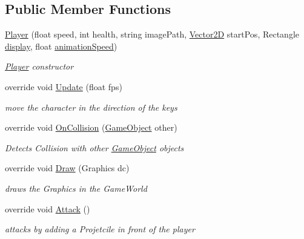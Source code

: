 \subsection*{Public Member Functions}
\begin{DoxyCompactItemize}
\item 
\hyperlink{class_mage_twinstick_1_1_player_ab0f3c00d033f0f20e743c04ae0eb6b11}{Player} (float speed, int health, string image\+Path, \hyperlink{class_mage_twinstick_1_1_vector2_d}{Vector2\+D} start\+Pos, Rectangle \hyperlink{class_mage_twinstick_1_1_game_object_a5807df7f837dc87c8955a008d0b27b50}{display}, float \hyperlink{class_mage_twinstick_1_1_game_object_a5d21c31402c27c5a19f2a62d98720456}{animation\+Speed})
\begin{DoxyCompactList}\small\item\em \hyperlink{class_mage_twinstick_1_1_player}{Player} constructor \end{DoxyCompactList}\item 
override void \hyperlink{class_mage_twinstick_1_1_player_a5324e0350784da0f66369ec5ef52516a}{Update} (float fps)
\begin{DoxyCompactList}\small\item\em move the character in the direction of the keys \end{DoxyCompactList}\item 
override void \hyperlink{class_mage_twinstick_1_1_player_adb9172ee6c160eb686076749d29be061}{On\+Collision} (\hyperlink{class_mage_twinstick_1_1_game_object}{Game\+Object} other)
\begin{DoxyCompactList}\small\item\em Detects Collision with other \hyperlink{class_mage_twinstick_1_1_game_object}{Game\+Object} objects \end{DoxyCompactList}\item 
override void \hyperlink{class_mage_twinstick_1_1_player_a2ccf76e50c0e5fa6642da04a4a5c4fa8}{Draw} (Graphics dc)
\begin{DoxyCompactList}\small\item\em draws the Graphics in the Game\+World \end{DoxyCompactList}\item 
override void \hyperlink{class_mage_twinstick_1_1_player_a418c80bddb416cd2cdd180ab21831f57}{Attack} ()
\begin{DoxyCompactList}\small\item\em attacks by adding a Projetcile in front of the player \end{DoxyCompactList}\end{DoxyCompactItemize}
